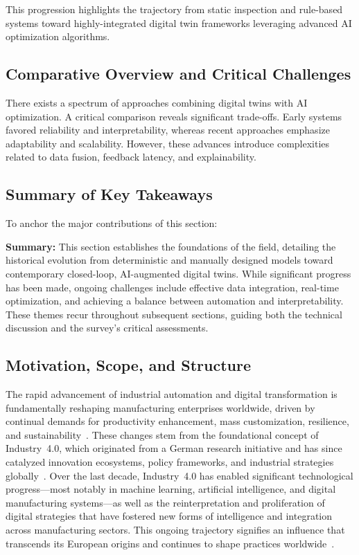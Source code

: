 \documentclass[sigconf]{acmart}
\begin{document}
This progression highlights the trajectory from static inspection and rule-based systems toward highly-integrated digital twin frameworks leveraging advanced AI optimization algorithms.

\subsection{Comparative Overview and Critical Challenges}
There exists a spectrum of approaches combining digital twins with AI optimization. A critical comparison reveals significant trade-offs. Early systems favored reliability and interpretability, whereas recent approaches emphasize adaptability and scalability. However, these advances introduce complexities related to data fusion, feedback latency, and explainability.

\subsection{Summary of Key Takeaways}
To anchor the major contributions of this section:

\textbf{Summary:} 
This section establishes the foundations of the field, detailing the historical evolution from deterministic and manually designed models toward contemporary closed-loop, AI-augmented digital twins. While significant progress has been made, ongoing challenges include effective data integration, real-time optimization, and achieving a balance between automation and interpretability. These themes recur throughout subsequent sections, guiding both the technical discussion and the survey's critical assessments.

\subsection{Motivation, Scope, and Structure}

The rapid advancement of industrial automation and digital transformation is fundamentally reshaping manufacturing enterprises worldwide, driven by continual demands for productivity enhancement, mass customization, resilience, and sustainability~\cite{ref50,ref54,ref62,ref63,ref67,ref86,ref91,ref92}. These changes stem from the foundational concept of Industry~4.0, which originated from a German research initiative and has since catalyzed innovation ecosystems, policy frameworks, and industrial strategies globally~\cite{ref24}. Over the last decade, Industry~4.0 has enabled significant technological progress—most notably in machine learning, artificial intelligence, and digital manufacturing systems—as well as the reinterpretation and proliferation of digital strategies that have fostered new forms of intelligence and integration across manufacturing sectors. This ongoing trajectory signifies an influence that transcends its European origins and continues to shape practices worldwide~\cite{ref24}.
\end{document}
